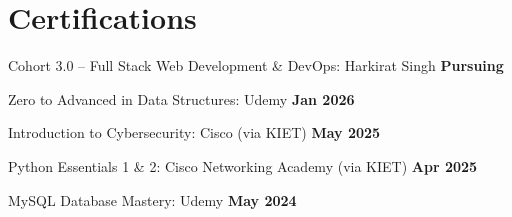 \documentclass[letterpaper,10pt]{article}
\begin{document}
\section{Certifications}
  \begin{itemize}[leftmargin=0.18in, itemsep=3.5pt, topsep=2pt]
    \small{
      \item Cohort 3.0 -- Full Stack Web Development \& DevOps: Harkirat Singh \hfill \textbf{Pursuing}
      \item Zero to Advanced in Data Structures: Udemy \hfill \textbf{Jan 2026}
      \item Introduction to Cybersecurity: Cisco (via KIET) \hfill \textbf{May 2025}
      \item Python Essentials 1 \& 2: Cisco Networking Academy (via KIET) \hfill \textbf{Apr 2025}
      \item MySQL Database Mastery: Udemy \hfill \textbf{May 2024}
    }
  \end{itemize}
\end{document}
